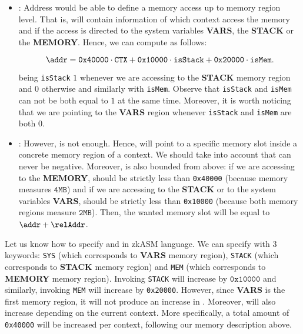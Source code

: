 \begin{itemize}

\item \addr: Address would be able to define a memory access up to memory region level. That is, \addr will contain information of which context access the memory and if the access is directed to the system variables \textbf{VARS}, the \textbf{STACK} or the \textbf{MEMORY}. Hence, we can compute \addr as follows:

\[
\addr = \texttt{0x40000} \cdot \texttt{CTX} + \texttt{0x10000} \cdot \texttt{isStack} + \texttt{0x20000} \cdot \texttt{isMem}.
\]

being \texttt{isStack} $1$ whenever we are accessing to the \textbf{STACK} memory region and $0$ otherwise and similarly with \texttt{isMem}. Observe that \texttt{isStack} and \texttt{isMem} can not be both equal to $1$ at the same time. Moreover, it is worth noticing that we are pointing to the \textbf{VARS} region whenever \texttt{isStack} and \texttt{isMem} are both $0$.

\item \relAddr: However, \addr is not enough. Hence, \relAddr will point to a specific memory slot inside a concrete memory region of a context. We should take into account that \relAddr can never be negative. Moreover, \relAddr is also bounded from above: if we are accessing to the \textbf{MEMORY}, \relAddr should be strictly less than \texttt{0x40000} (because memory measures $\texttt{4MB}$) and if we are accessing to the \textbf{STACK} or to the system variables \textbf{VARS}, \relAddr should be strictly less than \texttt{0x10000} (because both memory regions measure $\texttt{2MB}$). Then, the wanted memory slot will be equal to $\addr + \relAddr$.

\end{itemize}

Let us know how to specify \addr and \relAddr in zkASM language. We can specify \addr with $3$ keywords: \texttt{SYS} (which corresponds to \textbf{VARS} memory region), \texttt{STACK} (which corresponds to \textbf{STACK} memory region) and \texttt{MEM} (which corresponds to \textbf{MEMORY} memory region). Invoking \texttt{STACK} will increase \addr by $\texttt{0x10000}$ and similarly, invoking \texttt{MEM} will increase \addr by \texttt{0x20000}. However, since \textbf{VARS} is the first memory region, it will not produce an increase in \addr. Moreover, \addr will also increase depending on the current context. More specifically, a total amount of \texttt{0x40000} will be increased per context, following our memory description above. 

